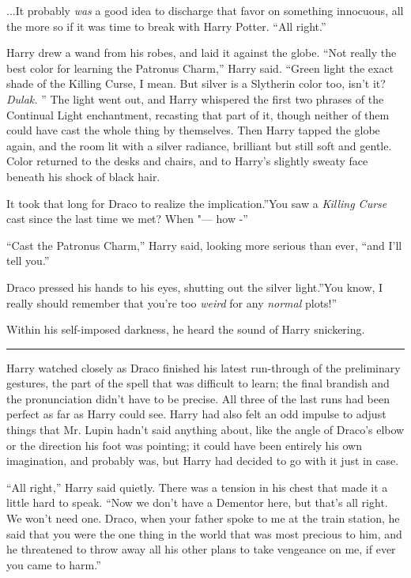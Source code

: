 ...It probably \emph{was} a good idea to discharge that favor on
something innocuous, all the more so if it was time to break with Harry
Potter. ``All right.''

Harry drew a wand from his robes, and laid it against the globe. ``Not
really the best color for learning the Patronus Charm,'' Harry said.
``Green light the exact shade of the Killing Curse, I mean. But silver is
a Slytherin color too, isn't it? \emph{Dulak.} '' The light went out, and
Harry whispered the first two phrases of the Continual Light
enchantment, recasting that part of it, though neither of them could
have cast the whole thing by themselves. Then Harry tapped the globe
again, and the room lit with a silver radiance, brilliant but still soft
and gentle. Color returned to the desks and chairs, and to Harry's
slightly sweaty face beneath his shock of black hair.

It took that long for Draco to realize the implication.''You saw a
\emph{Killing Curse} cast since the last time we met? When "--- how -''

``Cast the Patronus Charm,'' Harry said, looking more serious than ever,
``and I'll tell you.''

Draco pressed his hands to his eyes, shutting out the silver light.''You
know, I really should remember that you're too \emph{weird} for any
\emph{normal} plots!''

Within his self-imposed darkness, he heard the sound of Harry
snickering.

\begin{center}\rule{3in}{0.4pt}\end{center}

Harry watched closely as Draco finished his latest run-through of the
preliminary gestures, the part of the spell that was difficult to learn;
the final brandish and the pronunciation didn't have to be precise. All
three of the last runs had been perfect as far as Harry could see. Harry
had also felt an odd impulse to adjust things that Mr. Lupin hadn't said
anything about, like the angle of Draco's elbow or the direction his
foot was pointing; it could have been entirely his own imagination, and
probably was, but Harry had decided to go with it just in case.

``All right,'' Harry said quietly. There was a tension in his chest that
made it a little hard to speak. ``Now we don't have a Dementor here, but
that's all right. We won't need one. Draco, when your father spoke to me
at the train station, he said that you were the one thing in the world
that was most precious to him, and he threatened to throw away all his
other plans to take vengeance on me, if ever you came to harm.''


